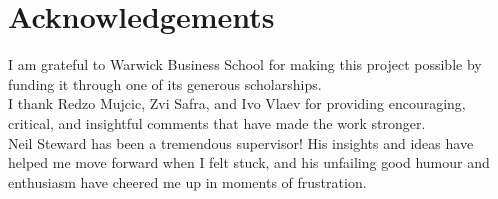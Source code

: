 
\chapter*{Acknowledgements}%
\label{cha:acknowledgements}

I am grateful to Warwick Business School for making this project possible by funding it through one of its generous scholarships.\\

I thank Redzo Mujcic, Zvi Safra, and Ivo Vlaev for providing encouraging, critical, and insightful comments that have made the work stronger.\\

\noindent Neil Steward has been a tremendous supervisor! His insights and ideas have
helped me move forward when I felt stuck, and his unfailing good humour and
enthusiasm have cheered me up in moments of frustration.

